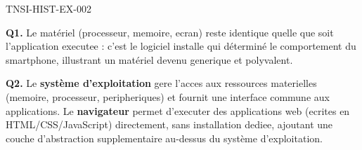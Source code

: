 \begin{corrige}{TNSI-HIST-EX-002}

\textbf{Q1.} Le matériel (processeur, memoire, ecran) reste identique quelle que soit l'application executee : c'est le logiciel installe qui déterminé le comportement du smartphone, illustrant un matériel devenu generique et polyvalent.

\textbf{Q2.} Le \textbf{système d'exploitation} gere l'acces aux ressources materielles (memoire, processeur, peripheriques) et fournit une interface commune aux applications. Le \textbf{navigateur} permet d'executer des applications web (ecrites en HTML/CSS/JavaScript) directement, sans installation dediee, ajoutant une couche d'abstraction supplementaire au-dessus du système d'exploitation.

\end{corrige}
